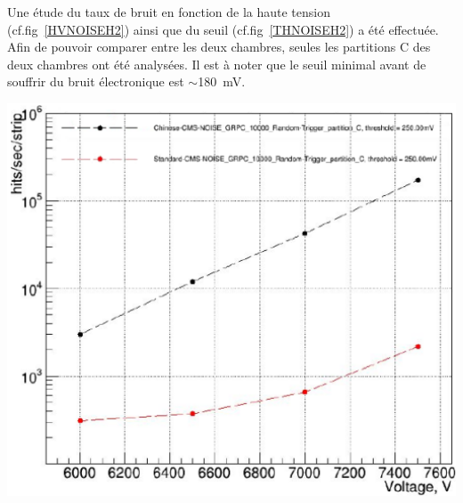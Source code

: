 Une étude du taux de bruit en fonction de la haute tension (cf.fig~\ref{HVNOISEH2}) ainsi que du seuil (cf.fig~\ref{THNOISEH2}) a été effectuée. Afin de pouvoir comparer entre les deux chambres, seules les partitions C des deux chambres ont été analysées.
Il est à noter que le seuil minimal avant de souffrir du bruit électronique est $\sim$\SI{180}{\milli\volt}.

\noindent
\begin{minipage}[th!]{.48\textwidth}
	\noindent
	\centering
	\includegraphics[width=1\textwidth]{GLA/HVNOISEH2.png}
	\label{HVNOISEH2}
\end{minipage}%
\hfill
